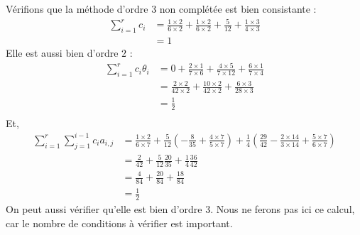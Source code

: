 \documentclass[a4paper, titlepage]{livret} %
\begin{document}
				Vérifions que la méthode d'ordre 3 non complétée est bien consistante :
				\[\begin{aligned}
					\sum_{i = 1}^{r} c_{i} & = \frac{1\times2}{6\times2} + \frac{1\times2}{6\times2} + \frac{5}{12} + \frac{1\times3}{4\times3}\\
										   & = 1
				\end{aligned}\]
				Elle est aussi bien d'ordre $2$ :
				\[\begin{aligned}
					\sum \limits_{i = 1}^{r} c_{i}\theta_{i} & = 0 + \frac{2 \times 1}{7 \times 6} + \frac{4 \times 5}{7 \times 12} + \frac{6 \times 1}{7 \times 4}\\
															 & = \frac{2\times2}{42\times2} + \frac{10\times2}{42\times2} + \frac{6\times3}{28\times3}\\
										   					 & = \frac{1}{2}\\
				\end{aligned}\]
				Et,
				\[\begin{aligned}
					\sum \limits_{i = 1}^{r}\sum \limits_{j = 1}^{i-1} c_{i}a_{i,j} & = \frac{1 \times 2}{6 \times 7} + \frac{5}{12}(-\frac{8}{35} + \frac{4 \times 7}{5 \times 7}) + \frac{1}{4}(\frac{29}{42} - \frac{2 \times 14}{3 \times 14} + \frac{5 \times 7}{6 \times 7}) \\
					& = \frac{2}{42} + \frac{5}{12}\frac{20}{35} + \frac{1}{4}\frac{36}{42} \\
					& = \frac{4}{84} + \frac{20}{84} + \frac{18}{84} \\
					& = \frac{1}{2}
				\end{aligned}\]
				On peut aussi vérifier qu'elle est bien d'ordre 3.
				Nous ne ferons pas ici ce calcul, car le nombre de conditions à vérifier est important.
\end{document}
